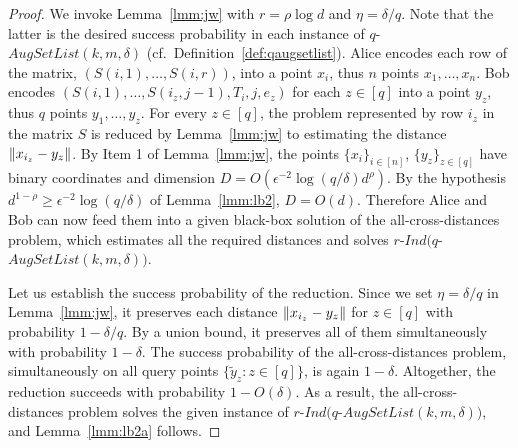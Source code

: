 \begin{proof}
We invoke Lemma~\ref{lmm:jw} with $r=\rho\log d$ and $\eta=\delta/q$.
Note that the latter is the desired success probability in each instance of $q$-$AugSetList(k,m,\delta)$ (cf.~Definition~\ref{def:qaugsetlist}).
Alice encodes each row of the matrix, $(S(i,1),\ldots,S(i,r))$, into a point $x_i$, thus $n$ points $x_1,\ldots,x_n$.
Bob encodes $(S(i,1),\ldots,S(i_z,j-1),T_i,j,e_z)$ for each $z\in[q]$ into a point $y_z$, thus $q$ points $y_1,\ldots,y_z$.
For every $z\in[q]$, the problem represented by row $i_z$ in the matrix $S$ is reduced by Lemma~\ref{lmm:jw} to estimating the distance $\lVert x_{i_z}-y_z\rVert$.
By Item 1 of Lemma~\ref{lmm:jw}, the points $\{x_i\}_{i\in[n]}$, $\{y_z\}_{z\in[q]}$ have binary coordinates and dimension $D=O(\epsilon^{-2}\log(q/\delta)d^\rho)$. 
By the hypothesis $d^{1-\rho}\geq\epsilon^{-2}\log(q/\delta)$ of Lemma~\ref{lmm:lb2}, $D=O(d)$.
Therefore Alice and Bob can now feed them into a given black-box solution of the all-cross-distances problem, which estimates all the required distances and solves $r$-$Ind(q$-$AugSetList(k,m,\delta))$.

Let us establish the success probability of the reduction.
Since we set $\eta=\delta/q$ in Lemma~\ref{lmm:jw}, it preserves each distance $\lVert x_{i_z}-y_z\rVert$ for $z\in[q]$ with probability $1-\delta/q$. By a union bound, it preserves all of them simultaneously with probability $1-\delta$.
The success probability of the all-cross-distances problem, simultaneously on all query points $\{\tilde y_z:z\in[q]\}$, is again $1-\delta$. Altogether, the reduction succeeds with probability $1-O(\delta)$. As a result, the all-cross-distances problem solves the given instance of  $r$-$Ind(q$-$AugSetList(k,m,\delta))$, and Lemma~\ref{lmm:lb2a} follows.
\end{proof}

